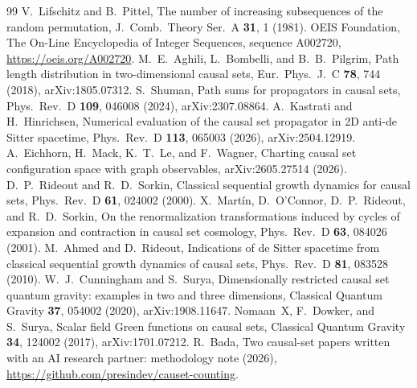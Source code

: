 \documentclass[prd,twocolumn,superscriptaddress,nofootinbib,amsmath,amssymb,floatfix]{revtex4-2}
\providecommand{\DIFaddtex}[1]{{\protect\color{blue}\uwave{#1}}} %
\providecommand{\DIFaddbegin}{} %
\providecommand{\DIFaddend}{} %
\providecommand{\DIFadd}[1]{\texorpdfstring{\DIFaddtex{#1}}{#1}} %
\providecommand{\DIFaddincludegraphics}[2][]{{\color{blue}\fbox{\DIFOincludegraphics[#1]{#2}}}} %
\DeclareRobustCommand{\DIFaddbegin}{\DIFOaddbegin \let\includegraphics\DIFaddincludegraphics} %
\DeclareRobustCommand{\DIFaddend}{\DIFOaddend \let\includegraphics\DIFOincludegraphics} %
\begin{document}
\begin{thebibliography}{99}
 V.~Lifschitz and B.~Pittel, The number of increasing subsequences of the random permutation, J.\ Comb.\ Theory Ser.\ A \textbf{31}, 1 (1981).
 OEIS Foundation, The On-Line Encyclopedia of Integer Sequences, sequence A002720, \url{https://oeis.org/A002720}.
 M.~E.~Aghili, L.~Bombelli, and B.~B.~Pilgrim, Path length distribution in two-dimensional causal sets, Eur.\ Phys.\ J.\ C \textbf{78}, 744 (2018), arXiv:1805.07312.
 S.~Shuman, Path sums for propagators in causal sets, Phys.\ Rev.\ D \textbf{109}, 046008 (2024), arXiv:2307.08864.
 A.~Kastrati and H.~Hinrichsen, Numerical evaluation of the causal set propagator in 2D anti-de Sitter spacetime, Phys.\ Rev.\ D \textbf{113}, 065003 (2026), arXiv:2504.12919.
 A.~Eichhorn, H.~Mack, K.~T.~Le, and F.~Wagner, Charting causal set configuration space with graph observables, arXiv:2605.27514 (2026).
 D.~P.~Rideout and R.~D.~Sorkin, Classical sequential growth dynamics for causal sets, Phys.\ Rev.\ D \textbf{61}, 024002 (2000).
 X.~Mart\'in, D.~O'Connor, D.~P.~Rideout, and R.~D.~Sorkin, On the renormalization transformations induced by cycles of expansion and contraction in causal set cosmology, Phys.\ Rev.\ D \textbf{63}, 084026 (2001).
 M.~Ahmed and D.~Rideout, Indications of de Sitter spacetime from classical sequential growth dynamics of causal sets, Phys.\ Rev.\ D \textbf{81}, 083528 (2010).
 W.~J.~Cunningham and S.~Surya, Dimensionally restricted causal set quantum gravity: examples in two and three dimensions, Classical Quantum Gravity \textbf{37}, 054002 (2020), arXiv:1908.11647.
 Nomaan~X, F.~Dowker, and S.~Surya, Scalar field Green functions on causal sets, Classical Quantum Gravity \textbf{34}, 124002 (2017), arXiv:1701.07212.
 R.~Bada, Two causal-set papers written with an AI research partner: methodology note (2026), \DIFaddbegin \DIFadd{to be released with the code at }\DIFaddend \url{https://github.com/presindev/causet-counting}.
\end{thebibliography}
\end{document}
